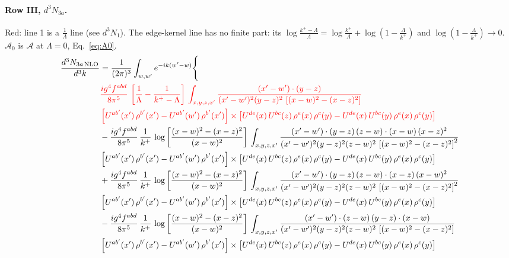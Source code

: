 \documentclass[10pt]{article}
\numberwithin{equation}{section}
\newcommand{\old}[1]{{\color{red}#1}}
\newcommand{\rc}{\color{red}}
\begin{document}
\paragraph{Row III, $d^3N_{3a}$.}
\old{Red}: line 1 is a $\frac{1}{\Lambda}$ line (see $d^3N_1$). The edge-kernel line has no finite part: its $\log\frac{k^+-\Lambda}{\Lambda}=\log\frac{k^+}{\Lambda}+\log(1-\frac{\Lambda}{k^+})$ and $\log(1-\frac{\Lambda}{k^+})\to0$. $\mathcal A_0$ is $\mathcal A$ at $\Lambda=0$, Eq.~\eqref{eq:A0}.
\begin{align}
\frac{d^{3}N_{3a\,\rm NLO}}{d^{3}k} & = \frac{1}{(2\pi)^{3}}\int_{w,w'}e^{-ik(w'-w)}\Bigg\{\notag \\
& \rc  \frac{ig^{4}f^{abd}}{8\pi^{5}}\,\left[\frac{1}{\Lambda}-\frac{1}{k^{+}-\Lambda}\right]\,\int_{x,y,z,x'}
\frac{(x'-w')\cdot(y-z)}{(x'-w')^{2}(y-z)^{2}\,\left[(x-w)^{2}-(x-z)^{2}\right]}\notag \\ & \rc  \left[U^{ab'}(x')\,\rho^{b'}(x')-U^{ab'}(w')\, \rho^{b'}(x')\right]\times \left[U^{de}(x)\,U^{bc}(z)\, \rho^{e}(x)\,\rho^{c}(y)-U^{de}(x)\,U^{bc}(y)\,\rho^{e}(x)\,\rho^{c}(y)\right] \notag \\
& 
-\frac{ig^{4}f^{abd}}{8\pi^{5}}\,\frac{1}{k^{+}}\,\log{\left[\frac{(x-w)^{2}-(x-z)^{2}}{(x-w)^{2}}\right]}\,\int_{x,y,z,x'}
\frac{(x'-w')\cdot(y-z)\,(z-w)\cdot(x-w)\,(x-z)^{2}}{(x'-w')^{2}(y-z)^{2}(z-w)^{2}\,\left[(x-w)^{2}-(x-z)^{2}\right]^{2}}\notag \\ & \left[U^{ab'}(x')\,\rho^{b'}(x')-U^{ab'}(w')\, \rho^{b'}(x')\right]\times \left[U^{de}(x)\,U^{bc}(z)\, \rho^{e}(x)\,\rho^{c}(y)-U^{de}(x)\,U^{bc}(y)\,\rho^{e}(x)\,\rho^{c}(y)\right] \notag \\
& +\frac{ig^{4}f^{abd}}{8\pi^{5}}\,\frac{1}{k^{+}}\,\log{\left[\frac{(x-w)^{2}-(x-z)^{2}}{(x-w)^{2}}\right]}\,\int_{x,y,z,x'}
\frac{(x'-w')\cdot(y-z)\,(z-w)\cdot(x-z)\,(x-w)^{2}}{(x'-w')^{2}(y-z)^{2}(z-w)^{2}\,\left[(x-w)^{2}-(x-z)^{2}\right]^{2}}\notag \\ 
&\left[U^{ab'}(x')\,\rho^{b'}(x')-U^{ab'}(w')\, \rho^{b'}(x')\right]\times \left[U^{de}(x)\,U^{bc}(z)\, \rho^{e}(x)\,\rho^{c}(y)-U^{de}(x)\,U^{bc}(y)\,\rho^{e}(x)\,\rho^{c}(y)\right] \notag \\
& -\frac{ig^{4}f^{abd}}{8\pi^{5}}\,\frac{1}{k^{+}}\,\log{\left[\frac{(x-w)^{2}-(x-z)^{2}}{(x-w)^{2}}\right]}\,\int_{x,y,z,x'}
\frac{(x'-w')\cdot(z-w)\,(y-z)\cdot(x-w)}{(x'-w')^{2}(y-z)^{2}(z-w)^{2}\,\left[(x-w)^{2}-(x-z)^{2}\right]}\notag \\ & \left[U^{ab'}(x')\,\rho^{b'}(x')-U^{ab'}(w')\, \rho^{b'}(x')\right]\times \left[U^{de}(x)\,U^{bc}(z)\, \rho^{e}(x)\,\rho^{c}(y)-U^{de}(x)\,U^{bc}(y)\,\rho^{e}(x)\,\rho^{c}(y)\right] \notag \\

\end{align}
\end{document}
